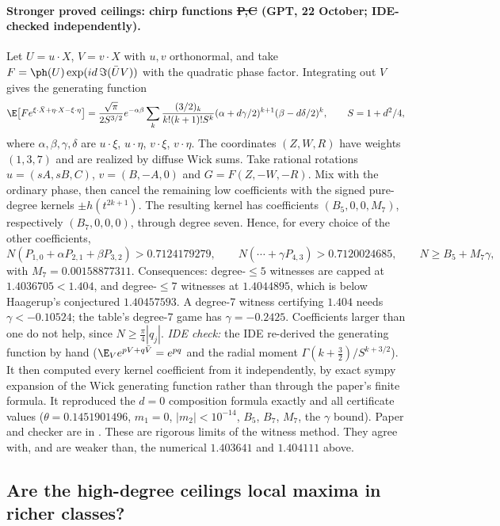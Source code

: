 \paragraph{Stronger proved ceilings: chirp functions \st{P,C} (GPT, 22 October; IDE-checked independently).}
Let $U=u\cdot X$, $V=v\cdot X$ with $u,v$ orthonormal, and take $F=\ph(U)\exp(id\,\Im(\bar UV))$ with the quadratic phase factor. Integrating out $V$ gives the generating function
\[
\E\bigl[F e^{\xi\cdot\bar X+\eta\cdot X-\xi\cdot\eta}\bigr]=\frac{\sqrt\pi}{2S^{3/2}}e^{-\alpha\beta}\sum_k\frac{(3/2)_k}{k!(k+1)!S^k}(\alpha+d\gamma/2)^{k+1}(\beta-d\delta/2)^k,
\qquad S=1+d^2/4,
\]
where $\alpha,\beta,\gamma,\delta$ are $u\cdot\xi$, $u\cdot\eta$, $v\cdot\xi$, $v\cdot\eta$. The coordinates $(Z,W,R)$ have weights $(1,3,7)$ and are realized by diffuse Wick sums. Take rational rotations
$u=(sA,sB,C)$, $v=(B,-A,0)$ and $G=F(Z,-W,-R)$. Mix with the ordinary phase, then cancel the remaining low coefficients with the signed pure-degree kernels $\pm h(t^{2k+1})$. The resulting kernel has
coefficients $(B_5,0,0,M_7)$, respectively $(B_7,0,0,0)$, through degree seven. Hence, for every choice of the other coefficients,
\[
N(P_{1,0}+\alpha P_{2,1}+\beta P_{3,2})>0.7124179279,\qquad N(\cdots+\gamma P_{4,3})>0.7120024685,\qquad N\ge B_5+M_7\gamma,
\]
with $M_7=0.00158877311$. Consequences: degree-$\le5$ witnesses are capped at $1.4036705<1.404$, and degree-$\le7$ witnesses at $1.4044895$, which is below Haagerup's
conjectured $1.40457593$. A degree-7 witness certifying $1.404$ needs $\gamma<-0.10524$; the table's degree-7 game has $\gamma=-0.2425$. Coefficients larger than one
do not help, since $N\ge\frac\pi4|q_j|$. \emph{IDE check:} the IDE re-derived the generating function by hand ($\E_Ve^{pV+q\bar V}=e^{pq}$ and the radial moment $\Gamma(k+\frac32)/S^{k+3/2}$).
It then computed every kernel coefficient from it independently, by exact sympy expansion of the Wick generating function rather than through the paper's finite formula. It reproduced the $d=0$ composition formula exactly
and all certificate values ($\theta=0.1451901496$, $m_1=0$, $|m_2|<10^{-14}$, $B_5$, $B_7$, $M_7$, the $\gamma$ bound). Paper and checker are in
. These are rigorous limits of the witness method. They agree with, and are weaker than, the numerical $1.403641$ and $1.404111$ above.

\subsection{Are the high-degree ceilings local maxima in richer classes?}\label{sec:wval}
